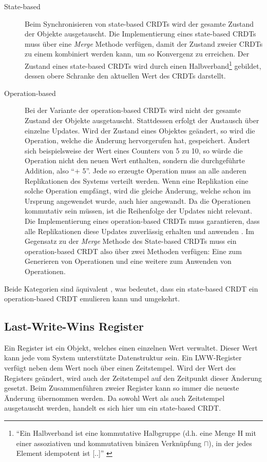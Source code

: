 \documentclass[a4paper, 12pt]{scrreprt}
\begin{document}
\begin{description}
\label{sec:stateopbased}
	\item[State-based]
	Beim Synchronisieren von state-based \acp{CRDT} wird der gesamte Zustand der Objekte ausgetauscht. Die Implementierung eines state-based CRDTs muss über eine \textit{Merge} Methode verfügen, damit der Zustand zweier \acp{CRDT} zu einem kombiniert werden kann, um so Konvergenz zu erreichen. Der Zustand eines state-based \acp{CRDT} wird durch einen Halbverband\footnote{\enquote{Ein Halbverband ist eine kommutative Halbgruppe (d.h. eine Menge H mit einer assoziativen und kommutativen binären Verknüpfung $\sqcap$), in der jedes Element idempotent ist [..]} \autocite{MiscHalbverband}} gebildet, dessen obere Schranke den aktuellen Wert des \acp{CRDT} darstellt. \autocite{InproceedingsStateBased}
	
	\item[Operation-based]
	Bei der Variante der operation-based \acp{CRDT} wird nicht der gesamte Zustand der Objekte ausgetauscht. Stattdessen erfolgt der Austausch über einzelne Updates. Wird der Zustand eines Objektes geändert, so wird die Operation, welche die Änderung hervorgerufen hat, gespeichert. Ändert sich beispielsweise der Wert eines Counters von 5 zu 10, so würde die Operation nicht den neuen Wert enthalten, sondern die durchgeführte Addition, also \enquote{+ 5}. Jede so erzeugte Operation muss an alle anderen Replikationen des Systems verteilt werden. Wenn eine Replikation eine solche Operation empfängt, wird die gleiche Änderung, welche schon im Ursprung angewendet wurde, auch hier angewandt. Da die Operationen kommutativ sein müssen, ist die Reihenfolge der Updates nicht relevant. Die Implementierung eines operation-based \acp{CRDT} muss garantieren, dass alle Replikationen diese Updates zuverlässig erhalten und anwenden \autocite[S.18-19]{ArticleCRDTOverview}. Im Gegensatz zu der \textit{Merge} Methode des State-based \acp{CRDT} muss ein operation-based CRDT also über zwei Methoden verfügen: Eine zum Generieren von Operationen und eine weitere zum Anwenden von Operationen.
\end{description} 

Beide Kategorien sind äquivalent \autocite[S. 9]{InproceedingsCRDTOriginal}, was bedeutet, dass ein state-based CRDT ein operation-based CRDT emulieren kann und umgekehrt.


\subsection{Last-Write-Wins Register}
\label{sec:lwwRegister}
\sloppypar
Ein Register ist ein Objekt, welches einen einzelnen Wert verwaltet. Dieser Wert kann jede vom System unterstützte Datenstruktur sein. Ein \ac{LWW-Register} verfügt neben dem Wert noch über einen Zeitstempel. Wird der Wert des Registers geändert, wird auch der Zeitstempel auf den Zeitpunkt dieser Änderung gesetzt. Beim Zusammenführen zweier Register kann so immer die neueste Änderung übernommen werden. Da sowohl Wert als auch Zeitstempel ausgetauscht werden, handelt es sich hier um ein state-based CRDT.
\end{document}
